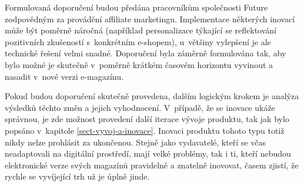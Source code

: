 \documentclass[12pt,twoside,openany]{fithesis}
\makeatletter
\def\cleardoublepage{\clearpage\if@twoside \ifodd\c@page\else
        \thispagestyle{empty}
        \hbox{}\newpage\if@twocolumn\hbox{}\newpage\fi\fi\fi}
\makeatother
\begin{document}
                          Formulovaná doporučení budou předána 
pracovníkům společnosti Future zodpovědným za provádění affiliate 
marketingu. Implementace některých inovací může být poměrně náročná 
(například personalizace týkající se reflektování pozitivních 
zkušeností s~konkrétním e-shopem), u~většiny vylepšení je ale 
technické řešení velmi snadné. Doporučení byla záměrně formulována 
tak, aby bylo možné je skutečně v~poměrně krátkém časovém horizontu 
vyvinout a nasadit v~nové verzi e-magazínu.

                          Pokud budou doporučení skutečně provedena, 
dalším logickým krokem je analýza výsledků těchto změn a jejich 
vyhodnocení. V~případě, že se inovace ukáže správnou, je zde možnost 
provedení další iterace vývoje produktu, tak jak bylo popsáno v~kapitole 
\hyperlink{sect-vyvoj-a-inovace}{{\ref{sect-vyvoj-a-inovace}}}. Inovaci 
produktu tohoto typu totiž nikdy nelze prohlásit za ukončenou. Stejně jako 
vydavatelé, kteří se včas neadaptovali na digitální prostředí, mají 
velké problémy, tak i ti, kteří nebudou elektronické verze svých 
magazínů pravidelně a znatelně inovovat, časem zjistí, že rychle se 
vyvíjející trh už je úplně jinde.

%									

										
										
	

\cleardoublepage
\renewcommand\bibname{Použitá literatura}
\end{document}
